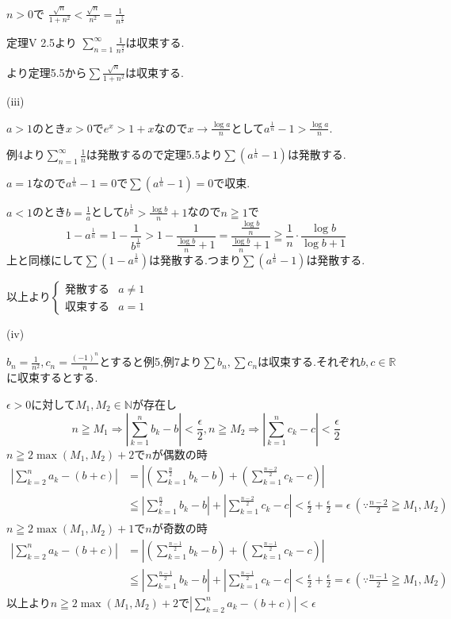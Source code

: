 \documentclass{jsarticle}
\begin{document}
$n>0$で
$\frac{\sqrt{n}}{1+n^2} < \frac{\sqrt{n}}{n^2} = \frac{1}{n^{\frac{3}{2}}}$

定理V 2.5より $\displaystyle\sum_{n=1}^{\infty} \frac{1}{n^{\frac{3}{2}}}$は収束する.

より定理5.5から$\sum \frac{\sqrt{n}}{1+n^2}$は収束する.

(iii)

$a > 1$のとき$x > 0$で$e^x > 1+x$なので$x\rightarrow \frac{\log a}{n}$として$a^{\frac{1}{n}}-1 > \frac{\log a}{n}$.

例4より$\displaystyle \sum_{n=1}^\infty \frac{1}{n}$は発散するので定理5.5より$\sum (a^{\frac{1}{n}}-1)$は発散する.

$a = 1$なので$a^{\frac{1}{n}}-1=0$で$\sum (a^{\frac{1}{n}}-1)=0$で収束.

$a < 1$のとき$b=\frac{1}{a}$として$b^{\frac{1}{n}} > \frac{\log b}{n} + 1$なので$n\geqq 1$で
\[1-a^{\frac{1}{n}}  = 1-\frac{1}{b^{\frac{1}{n}}} > 1-\frac{1}{\frac{\log b}{n} + 1} =
\frac{\frac{\log b}{n}}{\frac{\log b}{n} + 1}
\geqq \frac{1}{n}\cdot\frac{\log b}{\log b+1}\]
上と同様にして$\sum (1- a^{\frac{1}{n}})$は発散する.つまり$\sum (a^{\frac{1}{n}}-1)$は発散する.

以上より$\begin{cases}
発散する & a\neq 1\\
収束する & a = 1
\end{cases}$

(iv)

$b_n=\frac{1}{n^2},c_n = \frac{(-1)^n}{n}$とすると例5,例7より$\sum b_n,\sum c_n$は収束する.それぞれ$b,c\in\mathbb{R}$に収束するとする.

$\epsilon > 0$に対して$M_1,M_2\in\mathbb{N}$が存在し
\[n\geqq M_1\Rightarrow |\sum_{k=1}^nb_k - b| < \frac{\epsilon}{2} , n\geqq M_2\Rightarrow |\sum_{k=1}^nc_k - c| < \frac{\epsilon}{2} \]
$n\geqq 2\max (M_1,M_2)+2$で$n$が偶数の時
\begin{align*}
|\sum_{k=2}^n a_k - (b+c)| &= |(\sum_{k=1}^{\frac{n}{2}} b_k - b)+(\sum_{k=1}^{\frac{n-2}{2}} c_k - c)|\\
&\leqq |\sum_{k=1}^{\frac{n}{2}} b_k - b|+|\sum_{k=1}^{\frac{n-2}{2}} c_k - c| < \frac{\epsilon}{2}+\frac{\epsilon}{2} = \epsilon \ (\because \frac{n-2}{2} \geqq M_1,M_2)
\end{align*}
$n\geqq 2\max (M_1,M_2)+1$で$n$が奇数の時
\begin{align*}
|\sum_{k=2}^n a_k - (b+c)| &= |(\sum_{k=1}^{\frac{n-1}{2}} b_k - b)+(\sum_{k=1}^{\frac{n-1}{2}} c_k - c)|\\
&\leqq |\sum_{k=1}^{\frac{n-1}{2}} b_k - b|+|\sum_{k=1}^{\frac{n-1}{2}} c_k - c| < \frac{\epsilon}{2}+\frac{\epsilon}{2} = \epsilon \ (\because \frac{n-1}{2} \geqq M_1,M_2)
\end{align*}
以上より$n\geqq 2\max (M_1,M_2)+2$で$\displaystyle |\sum_{k=2}^na_k - (b+c)| < \epsilon$
\end{document}
